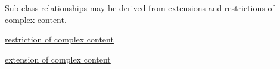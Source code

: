 Sub-\/class relationships may be derived from extensions and restrictions of complex content.


\begin{DoxyItemize}
\item \hyperlink{restrictioncomplexcontent}{restriction of complex content}
\item \hyperlink{extensioncomplexcontent}{extension of complex content} 
\end{DoxyItemize}
